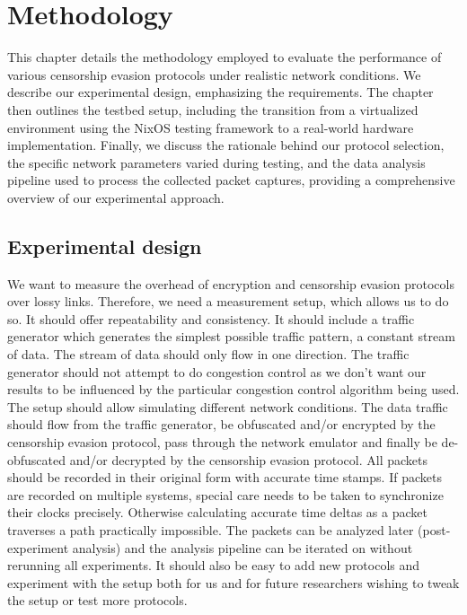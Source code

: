 
\chapter{Methodology}
\label{chap:methodology}

This chapter details the methodology employed to evaluate the performance of various censorship evasion protocols under realistic network conditions.
We describe our experimental design, emphasizing the requirements.
The chapter then outlines the testbed setup, including the transition from a virtualized environment using the NixOS testing framework to a real-world hardware implementation.
Finally, we discuss the rationale behind our protocol selection, the specific network parameters varied during testing, and the data analysis pipeline used to process the collected packet captures, providing a comprehensive overview of our experimental approach.

\section{Experimental design}
We want to measure the overhead of encryption and censorship evasion protocols over lossy links.
Therefore, we need a measurement setup, which allows us to do so.
It should offer repeatability and consistency.
It should include a traffic generator which generates the simplest possible traffic pattern, a constant stream of data.
The stream of data should only flow in one direction.
The traffic generator should not attempt to do congestion control as we don't want our results to be influenced by the particular congestion control algorithm being used.
The setup should allow simulating different network conditions.
The data traffic should flow from the traffic generator, be obfuscated and/or encrypted by the censorship evasion protocol, pass through the network emulator and finally be de-obfuscated and/or decrypted by the censorship evasion protocol.
All packets should be recorded in their original form with accurate time stamps.
If packets are recorded on multiple systems, special care needs to be taken to synchronize their clocks precisely.
Otherwise calculating accurate time deltas as a packet traverses a path practically impossible.
The packets can be analyzed later (post-experiment analysis) and the analysis pipeline can be iterated on without rerunning all experiments.
It should also be easy to add new protocols and experiment with the setup both for us and for future researchers wishing to tweak the setup or test more protocols.

